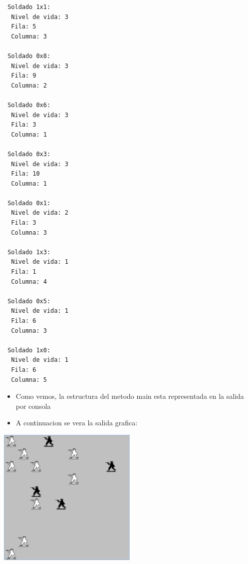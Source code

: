 \begin{lstlisting}
 Soldado 1x1:
  Nivel de vida: 3
  Fila: 5
  Columna: 3

 Soldado 0x8:
  Nivel de vida: 3
  Fila: 9
  Columna: 2

 Soldado 0x6:
  Nivel de vida: 3
  Fila: 3
  Columna: 1

 Soldado 0x3:
  Nivel de vida: 3
  Fila: 10
  Columna: 1

 Soldado 0x1:
  Nivel de vida: 2
  Fila: 3
  Columna: 3

 Soldado 1x3:
  Nivel de vida: 1
  Fila: 1
  Columna: 4

 Soldado 0x5:
  Nivel de vida: 1
  Fila: 6
  Columna: 3

 Soldado 1x0:
  Nivel de vida: 1
  Fila: 6
  Columna: 5
\end{lstlisting}
\begin{itemize}
  \item Como vemos, la estructura del metodo main esta representada en la salida por consola
  \item A continuacion se vera la salida grafica:
\end{itemize}
\includegraphics[width=0.5\textwidth]{img/exec.png}

